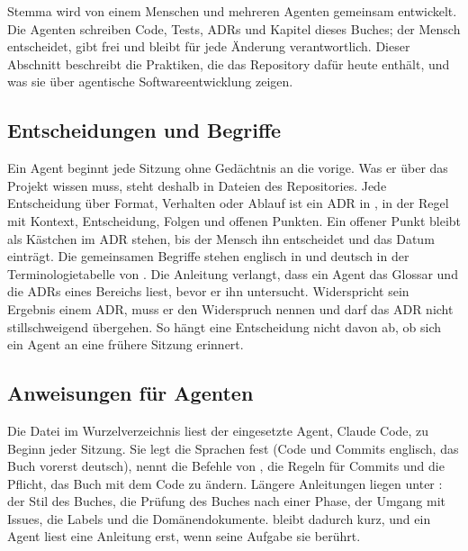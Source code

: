 Stemma wird von einem Menschen und mehreren Agenten gemeinsam entwickelt.
Die Agenten schreiben Code, Tests, ADRs und Kapitel dieses Buches;
der Mensch entscheidet, gibt frei und bleibt für jede Änderung verantwortlich.
Dieser Abschnitt beschreibt die Praktiken, die das Repository dafür heute enthält,
und was sie über agentische Softwareentwicklung zeigen.

\subsection{Entscheidungen und Begriffe}

Ein Agent beginnt jede Sitzung ohne Gedächtnis an die vorige.
Was er über das Projekt wissen muss, steht deshalb in Dateien des Repositories.
Jede Entscheidung über Format, Verhalten oder Ablauf ist ein ADR in ,
in der Regel mit Kontext, Entscheidung, Folgen und offenen Punkten.
Ein offener Punkt bleibt als Kästchen im ADR stehen,
bis der Mensch ihn entscheidet und das Datum einträgt.
Die gemeinsamen Begriffe stehen englisch in 
und deutsch in der Terminologietabelle von .
Die Anleitung  verlangt,
dass ein Agent das Glossar und die ADRs eines Bereichs liest, bevor er ihn untersucht.
Widerspricht sein Ergebnis einem ADR, muss er den Widerspruch nennen
und darf das ADR nicht stillschweigend übergehen.
So hängt eine Entscheidung nicht davon ab, ob sich ein Agent an eine frühere Sitzung erinnert.

\subsection{Anweisungen für Agenten}

Die Datei  im Wurzelverzeichnis liest der eingesetzte Agent, Claude Code,
zu Beginn jeder Sitzung.
Sie legt die Sprachen fest (Code und Commits englisch, das Buch vorerst deutsch),
nennt die Befehle von , die Regeln für Commits und die Pflicht,
das Buch mit dem Code zu ändern.
Längere Anleitungen liegen unter :
der Stil des Buches, die Prüfung des Buches nach einer Phase, der Umgang mit Issues,
die Labels und die Domänendokumente.
 bleibt dadurch kurz,
und ein Agent liest eine Anleitung erst, wenn seine Aufgabe sie berührt.

